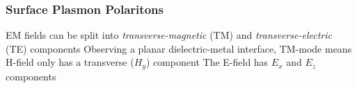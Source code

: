 \documentclass[10pt, compress]{beamer}
\begin{document}
\begin{frame}
  \frametitle{Surface Plasmon Polaritons}
  \begin{outline}
    \1 EM fields can be split into \textit{transverse-magnetic} (TM) and \textit{transverse-electric} (TE) components
    \1 Observing a planar dielectric-metal interface, TM-mode means H-field only has a transverse ($H_y$) component
    \2 The E-field has $E_x$ and $E_z$ components
  \end{outline}
\end{frame}

\begin{frame}
  \frametitle{}
\end{frame}

\end{document}
